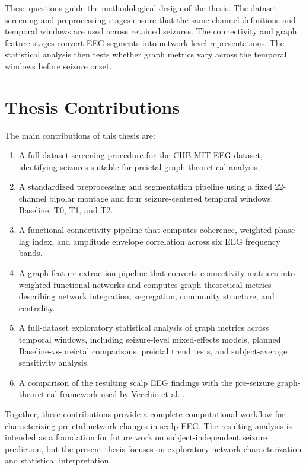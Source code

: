 These questions guide the methodological design of the thesis. The dataset
screening and preprocessing stages ensure that the same channel definitions and
temporal windows are used across retained seizures. The connectivity and graph
feature stages convert EEG segments into network-level representations. The
statistical analysis then tests whether graph metrics vary across the temporal
windows before seizure onset.

\section{Thesis Contributions}
\label{sec:introduction-contributions}

The main contributions of this thesis are:

\begin{enumerate}
    \item A full-dataset screening procedure for the CHB-MIT EEG dataset,
    identifying seizures suitable for preictal graph-theoretical analysis.

    \item A standardized preprocessing and segmentation pipeline using a fixed
    \num{22}-channel bipolar montage and four seizure-centered temporal windows:
    Baseline, T0, T1, and T2.

    \item A functional connectivity pipeline that computes coherence, weighted
    phase-lag index, and amplitude envelope correlation across six EEG frequency
    bands.

    \item A graph feature extraction pipeline that converts connectivity
    matrices into weighted functional networks and computes graph-theoretical
    metrics describing network integration, segregation, community structure,
    and centrality.

    \item A full-dataset exploratory statistical analysis of graph metrics
    across temporal windows, including seizure-level mixed-effects models,
    planned Baseline-vs-preictal comparisons, preictal trend tests, and
    subject-average sensitivity analysis.

    \item A comparison of the resulting scalp EEG findings with the
    pre-seizure graph-theoretical framework used by Vecchio et al.
    \cite{Vecchio2016}.
\end{enumerate}

Together, these contributions provide a complete computational workflow for
characterizing preictal network changes in scalp EEG. The resulting analysis is
intended as a foundation for future work on subject-independent seizure
prediction, but the present thesis focuses on exploratory network
characterization and statistical interpretation.

